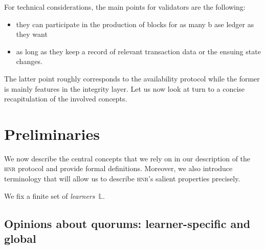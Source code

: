 \documentclass[%
dvipsnames,handout,draft]{article}
\theoremstyle{definition}
\newcommand{\base}[1][ ]{%
  b\ase[#1]%
}
\newcommand{\ase}[1][ ]{%
  ase ledger%
  \ifthenelse{\equal{#1}{ }}{}{#1}\xspace%
}
\newcommand{\hnr}{\textsc{hnr}\xspace}
\newcommand{\Lrnrs}{%
  \mathbb{L}
}
\begin{document}
For technical considerations,
the main points for validators are the following:
\begin{itemize}
\item %
  they can participate in the production of blocks for %
  as many \base[s] as they want %
\item %
  as long as they keep a record of relevant %
  transaction data or the ensuing state changes. %
\end{itemize}
The latter point roughly corresponds to the availability protocol %
while the former is mainly features in the integrity layer. %
Let us now look at turn to a concise recapitulation of the involved concepts. %

\color{black}

\section{Preliminaries}
\label{sec:preliminaries}
We now describe the central concepts %
that we rely on in our description of the \hnr protocol %
and provide formal definitions. %
Moreover,
we also introduce terminology 
that will allow us to describe \hnr's salient properties precisely. %


We fix a finite set of \emph{learners} \(\Lrnrs\). %

\subsection{Opinions about quorums: learner-specific and global}
\label{sec:quorum-sets}
\end{document}
